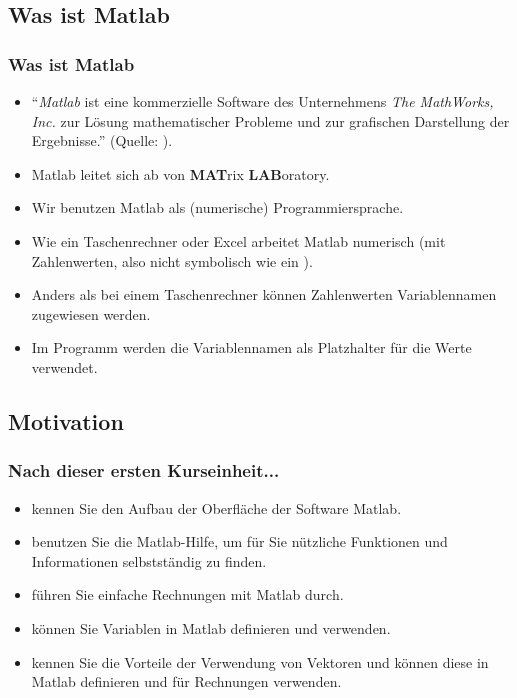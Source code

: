     \subsection{Was ist Matlab}
    \begin{frame}
        \frametitle{Was ist Matlab}
        \begin{itemize}
          \item ``\emph{Matlab} ist eine kommerzielle Software des Unternehmens \emph{The MathWorks, Inc.} zur Lösung mathematischer Probleme
          und zur grafischen Darstellung der Ergebnisse.'' (Quelle: ).
          \item Matlab leitet sich ab von \textbf{MAT}rix \textbf{LAB}oratory.
          \item Wir benutzen Matlab als (numerische) Programmiersprache.
          \item Wie ein Taschenrechner oder Excel arbeitet Matlab numerisch (mit Zahlenwerten, also nicht symbolisch wie
          ein ).
          \item Anders als bei einem Taschenrechner können Zahlenwerten Variablennamen zugewiesen werden.
          \item Im Programm werden die Variablennamen als Platzhalter für die Werte verwendet.
        \end{itemize}
    \end{frame}

    \subsection{Motivation}
    \begin{frame}
        \frametitle{Nach dieser ersten Kurseinheit...}
        \begin{itemize}
          \itemsep0.3cm
          \item kennen Sie den Aufbau der Oberfläche der Software Matlab.
          \item benutzen Sie die Matlab-Hilfe, um für Sie nützliche Funktionen und Informationen selbstständig zu finden.
          \item führen Sie einfache Rechnungen mit Matlab durch.
          \item können Sie Variablen in Matlab definieren und verwenden.
          \item kennen Sie die Vorteile der Verwendung von Vektoren und können diese in Matlab definieren und für Rechnungen verwenden.
        \end{itemize}
    \end{frame}

